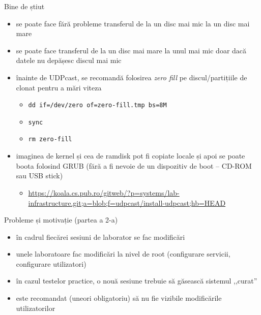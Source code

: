 \documentclass{beamer}
\begin{document}
\begin{frame}{Bine de știut}
  \begin{itemize}
    \item se poate face fără probleme transferul de la un disc mai mic la un
      disc mai mare
    \item se poate face transferul de la un disc mai mare la unul mai mic doar
      dacă datele nu depășesc discul mai mic
    \item înainte de UDPcast, se recomandă folosirea \textit{zero fill} pe
      discul/partițiile de clonat pentru a mări viteza
      \begin{itemize}
        \item \texttt{dd if=/dev/zero of=zero-fill.tmp bs=8M}
        \item \texttt{sync}
        \item \texttt{rm zero-fill}
      \end{itemize}
    \item imaginea de kernel și cea de ramdisk pot fi copiate locale și apoi
      se poate boota folosind GRUB (fără a fi nevoie de un dispozitiv de boot
      -- CD-ROM sau USB stick)
      \begin{itemize}
        \item
          \url{https://koala.cs.pub.ro/gitweb/?p=systems/lab-infrastructure.git;a=blob;f=udpcast/install-udpcast;hb=HEAD}
      \end{itemize}
  \end{itemize}
\end{frame}

\begin{frame}{Probleme și motivație (partea a 2-a)}
  \begin{itemize}
    \item în cadrul fiecărei sesiuni de laborator se fac modificări
    \item unele laboratoare fac modificări la nivel de root (configurare
      servicii, configurare utilizatori)
    \item în cazul testelor practice, o nouă sesiune trebuie să găsească
      sistemul ,,curat''
    \item este recomandat (uneori obligatoriu) să nu fie vizibile modificările
      utilizatorilor
  \end{itemize}
\end{frame}
\end{document}
